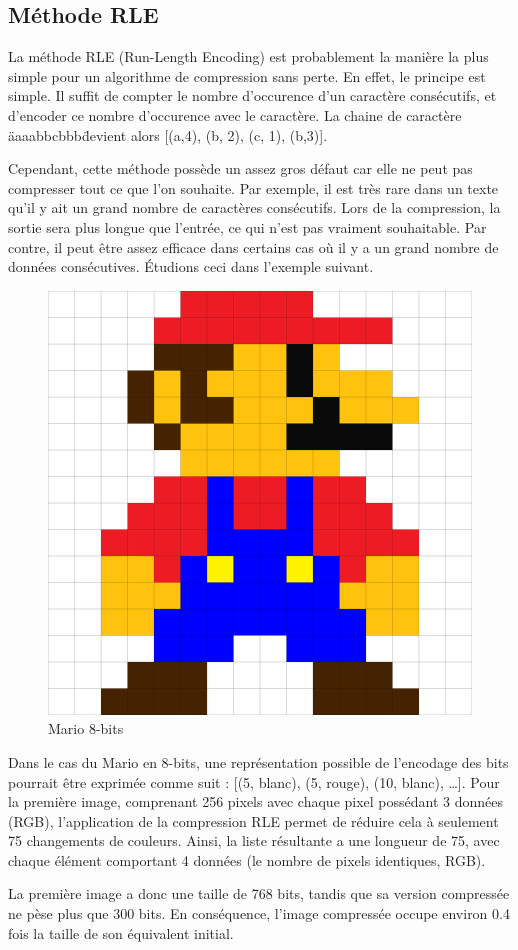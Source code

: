 \subsection{Méthode RLE}

    La méthode RLE (Run-Length Encoding) est probablement la manière la plus simple pour un algorithme de compression sans perte. En effet, le principe est simple. Il suffit de compter le nombre d'occurence d'un caractère consécutifs, et d'encoder ce nombre d'occurence avec le caractère. La chaine de caractère \"aaaabbcbbb\" devient alors [(a,4), (b, 2), (c, 1), (b,3)].

    \medskip

    Cependant, cette méthode possède un assez gros défaut car elle ne peut pas compresser tout ce que l'on souhaite. Par exemple, il est très rare dans un texte qu'il y ait un grand nombre de caractères consécutifs. Lors de la compression, la sortie sera plus longue que l'entrée, ce qui n'est pas vraiment souhaitable. Par contre, il peut être assez efficace dans certains cas où il y a un grand nombre de données consécutives. Étudions ceci dans l'exemple suivant.

    \begin{figure}[H]
        \centering
        \includegraphics[width=0.5\linewidth]{assets/mario8bits.png}
        \caption{Mario 8-bits}
    \end{figure}

    Dans le cas du Mario en 8-bits, une représentation possible de l'encodage des bits pourrait être exprimée comme suit : [(5, blanc), (5, rouge), (10, blanc), \ldots]. Pour la première image, comprenant 256 pixels avec chaque pixel possédant 3 données (RGB), l'application de la compression RLE permet de réduire cela à seulement 75 changements de couleurs. Ainsi, la liste résultante a une longueur de 75, avec chaque élément comportant 4 données (le nombre de pixels identiques, RGB).

    \smallskip

    La première image a donc une taille de 768 bits, tandis que sa version compressée ne pèse plus que 300 bits. En conséquence, l'image compressée occupe environ 0.4 fois la taille de son équivalent initial.

